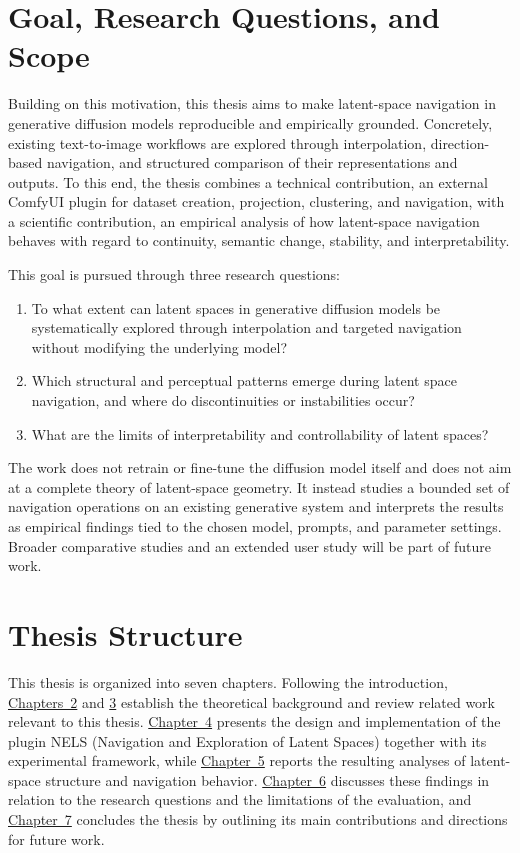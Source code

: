 \section{Goal, Research Questions, and Scope}\label{sec:1.2}

Building on this motivation, this thesis aims to make latent-space navigation in generative diffusion models reproducible and empirically grounded. Concretely, existing text-to-image workflows are explored through interpolation, direction-based navigation, and structured comparison of their representations and outputs. To this end, the thesis combines a technical contribution, an external ComfyUI plugin for dataset creation, projection, clustering, and navigation, with a scientific contribution, an empirical analysis of how latent-space navigation behaves with regard to continuity, semantic change, stability, and interpretability.

This goal is pursued through three research questions:

\begin{enumerate}
\item To what extent can latent spaces in generative diffusion models be systematically explored through interpolation and targeted navigation without modifying the underlying model?
\item Which structural and perceptual patterns emerge during latent space navigation, and where do discontinuities or instabilities occur?
\item What are the limits of interpretability and controllability of latent spaces?
\end{enumerate}

The work does not retrain or fine-tune the diffusion model itself and does not aim at a complete theory of latent-space geometry. It instead studies a bounded set of navigation operations on an existing generative system and interprets the results as empirical findings tied to the chosen model, prompts, and parameter settings. Broader comparative studies and an extended user study will be part of future work.

\section{Thesis Structure}\label{sec:1.3}

This thesis is organized into seven chapters. Following the introduction, \hyperref[ch:foundations]{Chapters~2} and \hyperref[ch:related-work]{3} establish the theoretical background and review related work relevant to this thesis. \hyperref[ch:system-design]{Chapter~4} presents the design and implementation of the plugin NELS (Navigation and Exploration of Latent Spaces) together with its experimental framework, while \hyperref[ch:results]{Chapter~5} reports the resulting analyses of latent-space structure and navigation behavior. \hyperref[ch:discussion]{Chapter~6} discusses these findings in relation to the research questions and the limitations of the evaluation, and \hyperref[ch:conclusion]{Chapter~7} concludes the thesis by outlining its main contributions and directions for future work.
